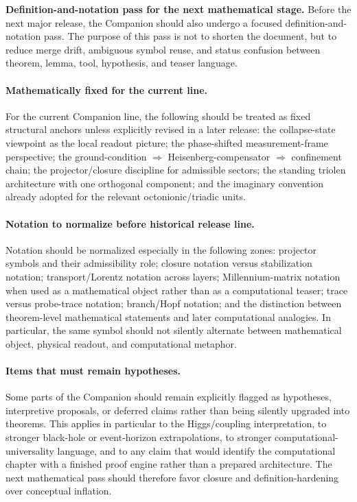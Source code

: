 \documentclass[12pt,a4paper]{article}
\DeclareRobustCommand{\QSCver}[1]{archival stage}
\renewcommand{\QSCver}[1]{historical release line}
\begin{document}
\noindent\textbf{Definition-and-notation pass for the next mathematical stage.} Before the next major release, the Companion should also undergo a focused definition-and-notation pass. The purpose of this pass is not to shorten the document, but to reduce merge drift, ambiguous symbol reuse, and status confusion between theorem, lemma, tool, hypothesis, and teaser language.

\paragraph{Mathematically fixed for the current line.}
For the current Companion line, the following should be treated as fixed structural anchors unless explicitly revised in a later release: the collapse-state viewpoint as the local readout picture; the phase-shifted measurement-frame perspective; the ground-condition $\Rightarrow$ Heisenberg-compensator $\Rightarrow$ confinement chain; the projector/closure discipline for admissible sectors; the standing triolen architecture with one orthogonal component; and the imaginary convention already adopted for the relevant octonionic/triadic units.

\paragraph{Notation to normalize before \QSCver{v2.27.0}.}
Notation should be normalized especially in the following zones: projector symbols and their admissibility role; closure notation versus stabilization notation; transport/Lorentz notation across layers; Millennium-matrix notation when used as a mathematical object rather than as a computational teaser; trace versus probe-trace notation; branch/Hopf notation; and the distinction between theorem-level mathematical statements and later computational analogies. In particular, the same symbol should not silently alternate between mathematical object, physical readout, and computational metaphor.

\paragraph{Items that must remain hypotheses.}
Some parts of the Companion should remain explicitly flagged as hypotheses, interpretive proposals, or deferred claims rather than being silently upgraded into theorems. This applies in particular to the Higgs/coupling interpretation, to stronger black-hole or event-horizon extrapolations, to stronger computational-universality language, and to any claim that would identify the computational chapter with a finished proof engine rather than a prepared architecture. The next mathematical pass should therefore favor closure and definition-hardening over conceptual inflation.
\end{document}
